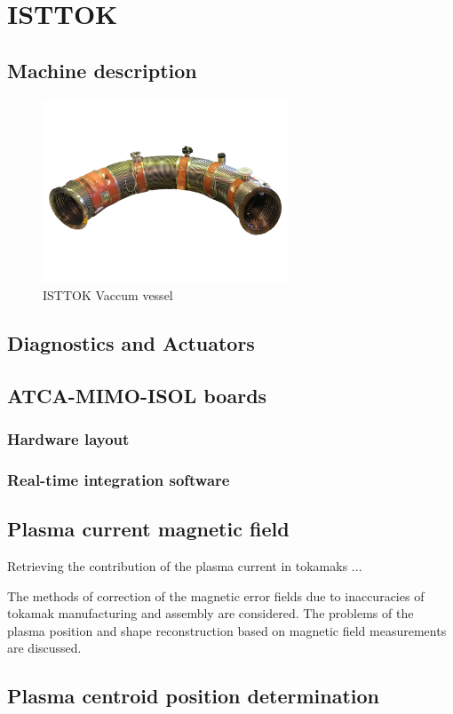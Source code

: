 \chapter{ISTTOK }

\section{Machine description}


\begin{figure}[htbp]
	\centering
	\includegraphics[width=0.65\textwidth]{Chp4/VacuumVessel_Low.png}
	\caption{\label{VV_IST} ISTTOK Vaccum vessel  }
\end{figure}


\section{Diagnostics and Actuators}
\section{ATCA-MIMO-ISOL boards}
\subsection{Hardware layout}
\subsection{Real-time  integration software}
\section{Plasma current magnetic field }

Retrieving the contribution of the plasma current in tokamaks ...

The methods of correction of the magnetic error fields due to inaccuracies
of tokamak manufacturing and assembly are considered. The problems of the
plasma position and shape reconstruction based on magnetic field measurements are discussed.

\section{Plasma centroid position determination}